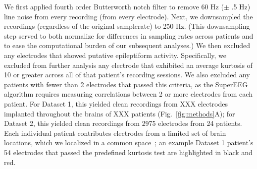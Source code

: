 \documentclass[11pt]{article}
\begin{document}
We first applied fourth order Butterworth notch filter to remove 60 Hz
($\pm$ .5 Hz) line noise from every recording (from every electrode).
Next, we downsampled the recordings (regardless of the original
samplerate) to 250 Hz.  (This downsampling step served to both
normalize for differences in sampling rates across patients and to
ease the computational burden of our subsequent analyses.)  We then
excluded any electrodes that showed putative epileptiform activity.
Specifically, we excluded from further analysis any electrode that
exhibited an average kurtosis of 10 or greater across all of that
patient's recording sessions.  We also excluded any patients with
fewer than 2 electrodes that passed this criteria, as the SuperEEG
algorithm requires measuring correlations between 2 or more electrodes
from each patient.  For Dataset 1, this yielded clean recordings from
XXX electrodes implanted throughout the brains of XXX patients
(Fig.~\ref{fig:methods}A); for Dataset 2, this yielded clean
recordings from 2975 electrodes from 24 patients.  Each individual
patient contributes electrodes from a limited set of brain locations,
which we localized in a common space~\citep[MNI152;][]{GrabEtal06}; an
example Dataset 1 patient's 54 electrodes that passed the predefined
kurtosis test are highlighted in black and red.
\end{document}
